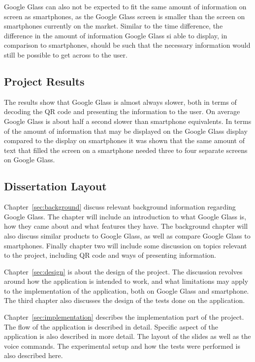 Google Glass can also not be expected to fit the same amount of information on screen as smartphones, as the Google Glass screen is smaller than the screen on smartphones currently on the market. Similar to the time difference, the difference in the amount of information Google Glass si able to display, in comparison to smartphones, should be such that the necessary information would still be possible to get across to the user.

\subsection{Project Results}
The results show that Google Glass is almost always slower, both in terms of decoding the QR code and presenting the information to the user. On average Google Glass is about half a second slower than smartphone equivalents. In terms of the amount of information that may be displayed on the Google Glass display compared to the display on smartphones it was shown that the same amount of text that filled the screen on a smartphone needed three to four separate screens on Google Glass.

\subsection{Dissertation Layout}
Chapter~\ref{sec:background} discuss relevant background information regarding Google Glass. The chapter will include an introduction to what Google Glass is, how they came about and what features they have. The background chapter will also discuss similar products to Google Glass, as well as compare Google Glass to smartphones. Finally chapter two will include some discussion on topics relevant to the project, including QR code and ways of presenting information.

Chapter~\ref{sec:design} is about the design of the project. The discussion revolves around how the application is intended to work, and what limitations may apply to the implementation of the application, both on Google Glass and smartphone. The third chapter also discusses the design of the tests done on the application.

Chapter~\ref{sec:implementation} describes the implementation part of the project. The flow of the application is described in detail. Specific aspect of the application is also described in more detail. The layout of the slides as well as the voice commands. The experimental setup and how the tests were performed is also described here.

